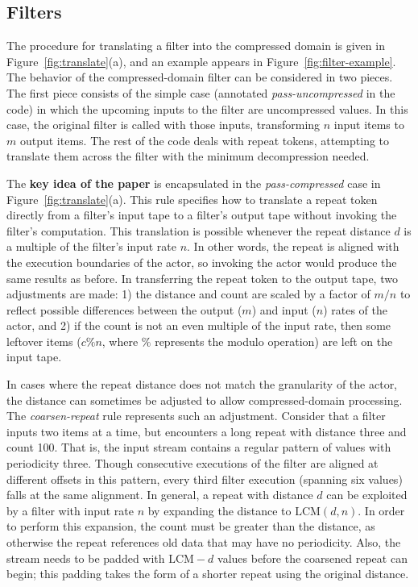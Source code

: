 \subsection{Filters}

The procedure for translating a filter into the compressed domain is
given in Figure~\ref{fig:translate}(a), and an example appears in
Figure~\ref{fig:filter-example}.  The behavior of the
compressed-domain filter can be considered in two pieces.  The first
piece consists of the simple case (annotated {\it pass-uncompressed}
in the code) in which the upcoming inputs to the filter are
uncompressed values.  In this case, the original filter is called with
those inputs, transforming $n$ input items to $m$ output items.  The
rest of the code deals with repeat tokens, attempting to translate
them across the filter with the minimum decompression needed.

The {\bf key idea of the paper} is encapsulated in the {\it
  pass-compressed} case in Figure~\ref{fig:translate}(a).  This rule
specifies how to translate a repeat token directly from a filter's
input tape to a filter's output tape without invoking the filter's
computation.  This translation is possible whenever the repeat
distance $d$ is a multiple of the filter's input rate $n$.  In other
words, the repeat is aligned with the execution boundaries of the
actor, so invoking the actor would produce the same results as before.
In transferring the repeat token to the output tape, two adjustments
are made: 1) the distance and count are scaled by a factor of $m/n$ to
reflect possible differences between the output ($m$) and input ($n$)
rates of the actor, and 2) if the count is not an even multiple of the
input rate, then some leftover items ($c\%n$, where $\%$ represents
the modulo operation) are left on the input tape.

In cases where the repeat distance does not match the granularity of
the actor, the distance can sometimes be adjusted to allow
compressed-domain processing.  The {\it coarsen-repeat} rule
represents such an adjustment.  Consider that a filter inputs two
items at a time, but encounters a long repeat with distance three and
count 100.  That is, the input stream contains a regular pattern of
values with periodicity three.  Though consecutive executions of the
filter are aligned at different offsets in this pattern, every third
filter execution (spanning six values) falls at the same alignment.
In general, a repeat with distance $d$ can be exploited by a filter
with input rate $n$ by expanding the distance to $\mbox{LCM}(d, n)$.
In order to perform this expansion, the count must be greater than the
distance, as otherwise the repeat references old data that may have no
periodicity.  Also, the stream needs to be padded with $\mbox{LCM}-d$
values before the coarsened repeat can begin; this padding takes the
form of a shorter repeat using the original distance.

